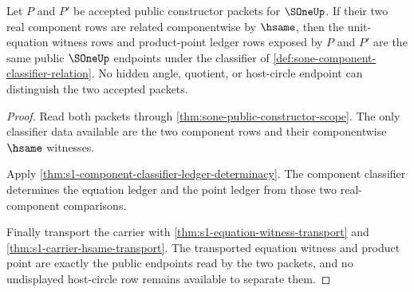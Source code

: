 \begin{theorem}
\label{thm:sone-public-endpoint-exactness}
Let $P$ and $P'$ be accepted public constructor packets for $\SOneUp$. If their
two real component rows are related componentwise by $\hsame$, then the
unit-equation witness rows and product-point ledger rows exposed by $P$ and
$P'$ are the same public $\SOneUp$ endpoints under the classifier of
\autoref{def:sone-component-classifier-relation}. No hidden angle, quotient, or
host-circle endpoint can distinguish the two accepted packets.
\end{theorem}
\begin{proof}
Read both packets through \autoref{thm:sone-public-constructor-scope}. The only
classifier data available are the two component rows and their componentwise
$\hsame$ witnesses.

Apply \autoref{thm:s1-component-classifier-ledger-determinacy}. The component
classifier determines the equation ledger and the point ledger from those two
real-component comparisons.

Finally transport the carrier with
\autoref{thm:s1-equation-witness-transport} and
\autoref{thm:s1-carrier-hsame-transport}. The transported equation witness and
product point are exactly the public endpoints read by the two packets, and no
undisplayed host-circle row remains available to separate them.
\end{proof}

